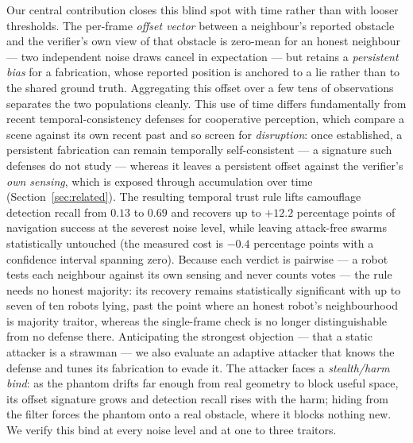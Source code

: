 Our central contribution closes this blind spot with time rather than with
looser thresholds. The per-frame \emph{offset vector} between a neighbour's
reported obstacle and the verifier's own view of that obstacle is zero-mean
for an honest neighbour --- two independent noise draws cancel in
expectation --- but retains a \emph{persistent bias} for a fabrication,
whose reported position is anchored to a lie rather than to the shared
ground truth. Aggregating this offset over a few tens of observations
separates the two populations cleanly. This use of time differs
fundamentally from recent temporal-consistency defenses for cooperative
perception, which compare a scene against its own recent past and so screen
for \emph{disruption}: once established, a persistent fabrication can
remain temporally self-consistent --- a signature such defenses do not
study --- whereas it leaves a persistent offset against the verifier's
\emph{own sensing}, which is exposed through accumulation over time
(Section~\ref{sec:related}). The resulting temporal trust rule
lifts camouflage detection recall from $0.13$ to $0.69$ and recovers up to
$+12.2$ percentage points of navigation success at the severest noise
level, while leaving attack-free swarms statistically untouched (the
measured cost is $-0.4$ percentage points with a confidence interval
spanning zero). Because each verdict is pairwise --- a robot tests each
neighbour against its own sensing and never counts votes --- the rule needs
no honest majority: its recovery remains statistically significant with up
to seven of ten robots lying, past the point where an honest robot's
neighbourhood is majority traitor, whereas the single-frame check is no
longer distinguishable from no defense there. Anticipating the strongest objection --- that a static
attacker is a strawman --- we also evaluate an adaptive attacker that knows
the defense and tunes its fabrication to evade it. The attacker faces a
\emph{stealth/harm bind}: as the phantom drifts far enough from real
geometry to block useful space, its offset signature grows and detection
recall rises with the harm; hiding from the filter forces the phantom onto
a real obstacle, where it blocks nothing new. We verify this bind at every
noise level and at one to three traitors.


